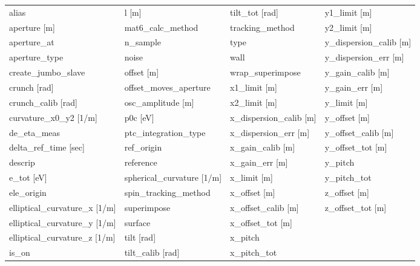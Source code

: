  \begin{tabular}{llll} \toprule
alias                            & l [m]                            & tilt_tot [rad]                   & y1_limit [m]                     \\
aperture [m]                     & mat6_calc_method                 & tracking_method                  & y2_limit [m]                     \\
aperture_at                      & n_sample                         & type                             & y_dispersion_calib [m]           \\
aperture_type                    & noise                            & wall                             & y_dispersion_err [m]             \\
create_jumbo_slave               & offset [m]                       & wrap_superimpose                 & y_gain_calib [m]                 \\
crunch [rad]                     & offset_moves_aperture            & x1_limit [m]                     & y_gain_err [m]                   \\
crunch_calib [rad]               & osc_amplitude [m]                & x2_limit [m]                     & y_limit [m]                      \\
curvature_x0_y2 [1/m]            & p0c [eV]                         & x_dispersion_calib [m]           & y_offset [m]                     \\
de_eta_meas                      & ptc_integration_type             & x_dispersion_err [m]             & y_offset_calib [m]               \\
delta_ref_time [sec]             & ref_origin                       & x_gain_calib [m]                 & y_offset_tot [m]                 \\
descrip                          & reference                        & x_gain_err [m]                   & y_pitch                          \\
e_tot [eV]                       & spherical_curvature [1/m]        & x_limit [m]                      & y_pitch_tot                      \\
ele_origin                       & spin_tracking_method             & x_offset [m]                     & z_offset [m]                     \\
elliptical_curvature_x [1/m]     & superimpose                      & x_offset_calib [m]               & z_offset_tot [m]                 \\
elliptical_curvature_y [1/m]     & surface                          & x_offset_tot [m]                 &                                  \\
elliptical_curvature_z [1/m]     & tilt [rad]                       & x_pitch                          &                                  \\
is_on                            & tilt_calib [rad]                 & x_pitch_tot                      &                                  \\
 \bottomrule
 \end{tabular}
 \vfill
 
